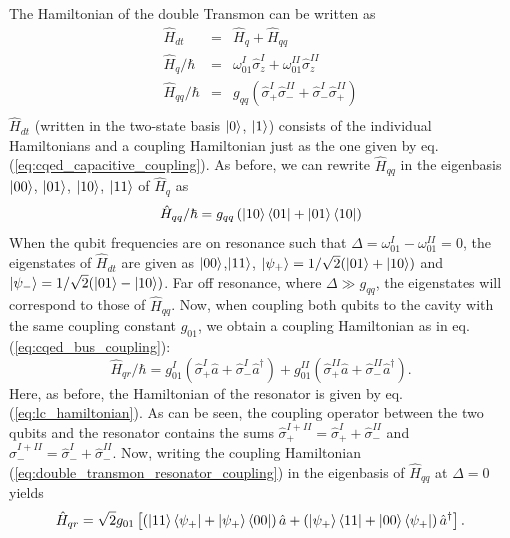 The Hamiltonian of the double Transmon can be written as
%
\begin{eqnarray}
\hat{H}_{dt}       & = & \hat{H}_q+\hat{H}_{qq} \\
\hat{H}_{q}/\hbar  & = & \omega_{01}^I\hat{\sigma}_z^I+\omega_{01}^{II}\hat{\sigma}_z^{II} \\
\hat{H}_{qq}/\hbar & = & g_{qq}\left(\hat{\sigma}_+^I\hat{\sigma}_-^{II}+\hat{\sigma}_-^I\hat{\sigma}_+^{II}\right) \\
\end{eqnarray}
%
$\hat{H}_{dt}$ (written in the two-state basis $\left| 0 \right>$, $\left| 1 \right>$) consists of the individual Hamiltonians and a coupling Hamiltonian just as the one given by eq. (\ref{eq:cqed_capacitive_coupling}). As before, we can rewrite $\hat{H}_{qq}$ in the eigenbasis $\left| 00 \right>$, $\left| 01 \right>$, $\left| 10 \right>$, $\left| 11 \right>$ of $\hat{H}_q$ as
%
\begin{equation}
\hat{H}_{qq}/\hbar = g_{qq}\left(\left| 10 \right>\left< 01 \right|+\left| 01 \right>\left< 10 \right|\right)
\end{equation}
%
When the qubit frequencies are on resonance such that $\Delta = \omega_{01}^I-\omega_{01}^{II}=0$, the eigenstates of $\hat{H}_{dt}$ are given as $\left| 00 \right>$,$\left| 11 \right>$, $\left| \psi_+ \right>=1/\sqrt{2}(\left| 01 \right>+\left| 10 \right>)$ and $\left| \psi_- \right>=1/\sqrt{2}(\left| 01 \right>-\left| 10 \right>)$. Far off resonance, where $\Delta \gg g_{qq}$, the eigenstates will correspond to those of $\hat{H}_{qq}$. Now, when coupling both qubits to the cavity with the same coupling constant $g_{01}$, we obtain a coupling Hamiltonian as in eq. (\ref{eq:cqed_bus_coupling}):
%
\begin{equation}
\hat{H}_{qr}/\hbar = g_{01}^I\left(\hat{\sigma}_+^I\hat{a}+\hat{\sigma}_-^I\hat{a}^\dagger\right)+g_{01}^{II}\left(\hat{\sigma}_+^{II}\hat{a}+\hat{\sigma}_-^{II}\hat{a}^\dagger \right). \label{eq:double_transmon_resonator_coupling}
\end{equation}
%
Here, as before, the Hamiltonian of the resonator is given by eq. (\ref{eq:lc_hamiltonian}). As can be seen, the coupling operator between the two qubits and the resonator contains the sums $\hat{\sigma}_+^{I+II}=\hat{\sigma}_+^I+\hat{\sigma}_-^{II}$ and $\hat{\sigma}_-^{I+II}=\hat{\sigma}_-^I+\hat{\sigma}_-^{II}$. Now, writing the coupling Hamiltonian (\ref{eq:double_transmon_resonator_coupling}) in the eigenbasis of $\hat{H}_{qq}$ at $\Delta=0$ yields
%
\begin{equation}
\hat{H}_{qr} = \sqrt{2}g_{01}\left[\left(\left| 11 \right>\left< \psi_+ \right|+\left| \psi_+ \right>\left< 00 \right|\right)\hat{a}+\left(\left| \psi_+ \right>\left< 11 \right|+\left| 00 \right>\left< \psi_+ \right|\right)\hat{a}^\dagger\right].
\end{equation}
